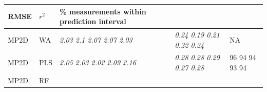 \documentclass[utf8]{frontiersHLTH} %
\begin{document}
\begin{longtable}[]{@{}lllll@{}}
\begin{minipage}[b]{0.19\columnwidth}
RMSE\strut
\end{minipage} & \begin{minipage}[b]{0.19\columnwidth}\raggedright\strut
\(r^2\)\strut
\end{minipage} & \begin{minipage}[b]{0.27\columnwidth}\raggedright\strut
\% measurements within prediction interval\strut
\end{minipage}\tabularnewline
\midrule
\endhead
\begin{minipage}[t]{0.13\columnwidth}\raggedright\strut
MP2D\strut
\end{minipage} & \begin{minipage}[t]{0.08\columnwidth}\raggedright\strut
WA\strut
\end{minipage} & \begin{minipage}[t]{0.19\columnwidth}\raggedright\strut
\emph{2.03 2.1 2.07 2.07 2.03}\strut
\end{minipage} & \begin{minipage}[t]{0.19\columnwidth}\raggedright\strut
\emph{0.24 0.19 0.21 0.22 0.24}\strut
\end{minipage} & \begin{minipage}[t]{0.27\columnwidth}\raggedright\strut
NA\strut
\end{minipage}\tabularnewline
\begin{minipage}[t]{0.13\columnwidth}\raggedright\strut
MP2D\strut
\end{minipage} & \begin{minipage}[t]{0.08\columnwidth}\raggedright\strut
PLS\strut
\end{minipage} & \begin{minipage}[t]{0.19\columnwidth}\raggedright\strut
\emph{2.05 2.03 2.02 2.09 2.16}\strut
\end{minipage} & \begin{minipage}[t]{0.19\columnwidth}\raggedright\strut
\emph{0.28 0.28 0.29 0.27 0.28}\strut
\end{minipage} & \begin{minipage}[t]{0.27\columnwidth}\raggedright\strut
96 94 94 93 94\strut
\end{minipage}\tabularnewline
\begin{minipage}[t]{0.13\columnwidth}\raggedright\strut
MP2D\strut
\end{minipage} & \begin{minipage}[t]{0.08\columnwidth}\raggedright\strut
RF\strut
\end{minipage} & \begin{minipage}[t]{0.19\columnwidth}\raggedright\strut

\end{minipage}
\end{longtable}
\end{document}
